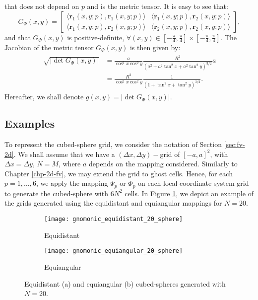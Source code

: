 that does not depend on $p$ and is the  metric tensor.
It is easy to see that:
\begin{equation}
	\label{chp3-eqangle-phi-metric-tensor}
	G_{\Phi}(x,y) = 
	\begin{bmatrix}
		\langle \boldsymbol{r}_{1}(x,y;p), \boldsymbol{r}_{1}(x,y;p) \rangle & 
		\langle \boldsymbol{r}_{1}(x,y;p), \boldsymbol{r}_{2}(x,y;p) \rangle \\
		\langle \boldsymbol{r}_{1}(x,y;p), \boldsymbol{r}_{2}(x,y;p) \rangle  &
		\langle \boldsymbol{r}_{2}(x,y;p), \boldsymbol{r}_{2}(x,y;p) \rangle 
	\end{bmatrix},
\end{equation}
and that $G_{\Phi}(x,y)$ is positive-definite, 
$\forall (x,y) \in [-\frac{\pi}{4},\frac{\pi}{4}] 
\times [-\frac{\pi}{4},\frac{\pi}{4}]$.
The Jacobian of the metric tensor $G_{\Phi}(x,y)$ is then given by:
\begin{align}
	\label{metrictensor-cs-equiangular}
	\begin{split}
		\sqrt{|\det{G_{\Phi}(x,y)}|} &= \frac{a}{\cos^2 x \cos^2 y}
		\frac{R^2}{(a^2 + a^2\tan^2x + a^2\tan^2y)^{3/2}}a\\
		&= \frac{R^2}{\cos^2 x \cos^2 y}
		\frac{1}{(1 + \tan^2x + \tan^2y)^{3/2}}.
	\end{split}
\end{align}
Hereafter, we shall denote $g(x,y) = |\det{G_{\Phi}(x,y)}|$.
\subsection{Examples}
To represent the cubed-sphere grid, we consider the notation of Section \ref{sec:fv-2d}.
We shall assume that we have a $(\Delta x, \Delta y)-$grid of $[-a,a]^2$, with $\Delta x= \Delta y$, $N=M$,
where $a$ depends on the mapping considered.
Similarly to Chapter \ref{chp-2d-fv}, we may extend the grid to ghost cells.
Hence, for each $p=1, \ldots, 6$, we apply the mapping $\Psi_p$ or $\Phi_p$ on
each local coordinate system grid to generate the cubed-sphere with $6N^2$ cells.
In Figure \ref{chp4-cs-grid}, we depict an example of the grids generated using 
the equidistant and equiangular mappings for $N=20$.
\begin{figure}[!htb]
	\centering
	\begin{subfigure}{0.48\textwidth}
		\centering
		\texttt{[image: gnomonic\_equidistant\_20\_sphere]}
		\caption{Equidistant}
	\end{subfigure}
	\begin{subfigure}{0.48\textwidth}
		\centering
		\texttt{[image: gnomonic\_equiangular\_20\_sphere]}
		\caption{Equiangular}
	\end{subfigure}
	\caption{Equidistant (a) and equiangular (b) cubed-spheres generated with $N=20$.
		\label{chp4-cs-grid}}
\end{figure}

